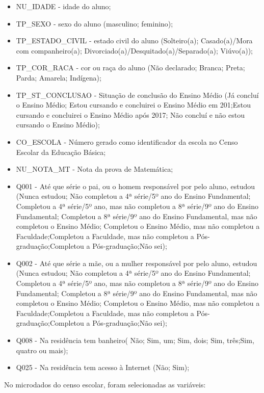 \begin{itemize}
	\item NU\_IDADE - idade do aluno;
	\item TP\_SEXO - sexo do aluno (masculino; feminino);
	\item TP\_ESTADO\_CIVIL - estado civil do aluno (Solteiro(a); Casado(a)/Mora com companheiro(a); Divorciado(a)/Desquitado(a)/Separado(a);  Viúvo(a));
	\item TP\_COR\_RACA - cor ou raça do aluno (Não declarado; Branca; Preta; Parda; Amarela; Indígena);
		\item TP\_ST\_CONCLUSAO - Situação de conclusão do Ensino Médio (Já concluí o Ensino Médio; Estou cursando e concluirei o Ensino Médio em 201;Estou cursando e concluirei o Ensino Médio após 2017; Não concluí e não estou cursando o Ensino Médio);
		\item CO\_ESCOLA -  Número gerado como identificador da escola no Censo Escolar da Educação Básica;
		\item NU\_NOTA\_MT - Nota da prova de Matemática;
		\item Q001 - Até que série o pai, ou o homem responsável por pelo aluno, estudou (Nunca estudou; Não completou a 4ª série/5º ano do Ensino Fundamental; Completou a 4ª série/5º ano, mas não completou a 8ª série/9º ano do Ensino Fundamental; Completou a 8ª série/9º ano do Ensino Fundamental, mas não completou o Ensino Médio; Completou o Ensino Médio, mas não completou a Faculdade;Completou a Faculdade, mas não completou a Pós-graduação;Completou a Pós-graduação;Não sei);
		\item Q002 - Até que série a mãe, ou a mulher responsável por pelo aluno, estudou (Nunca estudou; Não completou a 4ª série/5º ano do Ensino Fundamental; Completou a 4ª série/5º ano, mas não completou a 8ª série/9º ano do Ensino Fundamental; Completou a 8ª série/9º ano do Ensino Fundamental, mas não completou o Ensino Médio; Completou o Ensino Médio, mas não completou a Faculdade;Completou a Faculdade, mas não completou a Pós-graduação;Completou a Pós-graduação;Não sei);
		\item Q008 - Na residência tem banheiro( Não; Sim, um; Sim, dois; Sim, três;Sim, quatro ou mais);
		\item Q025 - Na residência tem acesso à Internet (Não; Sim);
	\end{itemize}
	No microdados do censo escolar, foram selecionadas as variáveis:
